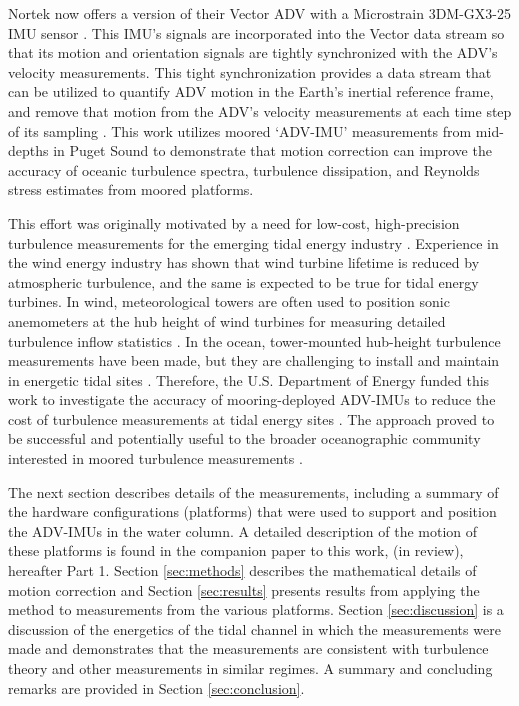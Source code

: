 Nortek now offers a version of their Vector ADV with a Microstrain 3DM-GX3-25 IMU sensor \cite[]{vector_manual2005, MicroStrain2012a}. This IMU's signals are incorporated into the Vector data stream so that its motion and orientation signals are tightly synchronized with the ADV's velocity measurements. This tight synchronization provides a data stream that can be utilized to quantify ADV motion in the Earth's inertial reference frame, and remove that motion from the ADV's velocity measurements at each time step of its sampling \cite[]{Edson++1998}. This work utilizes moored `ADV-IMU' measurements from mid-depths in Puget Sound to demonstrate that motion correction can improve the accuracy of oceanic turbulence spectra, turbulence dissipation, and Reynolds stress estimates from moored platforms.

This effort was originally motivated by a need for low-cost, high-precision turbulence measurements for the emerging tidal energy industry \cite[]{Mccaffrey++2015, Alexander+Hamlington2015}. Experience in the wind energy industry has shown that wind turbine lifetime is reduced by atmospheric turbulence, and the same is expected to be true for tidal energy turbines. In wind, meteorological towers are often used to position sonic anemometers at the hub height of wind turbines for measuring detailed turbulence inflow statistics \cite[]{Hand++2003, Kelley++2005, Mucke++2011, Afgan++2013}. In the ocean, tower-mounted hub-height turbulence measurements have been made, but they are challenging to install and maintain in energetic tidal sites \cite[]{Gunawan++2014,Thomson++2012}. Therefore, the U.S. Department of Energy funded this work to investigate the accuracy of mooring-deployed ADV-IMUs to reduce the cost of turbulence measurements at tidal energy sites \cite[]{Kilcher++2016}. The approach proved to be successful and potentially useful to the broader oceanographic community interested in moored turbulence measurements \cite[]{Lueck+Huang1999, Doherty++1999, Nash++2004, Moum+Nash2009b, Alford2010, Paskyabi+Fer2013}.

The next section describes details of the measurements, including a summary of the hardware configurations (platforms) that were used to support and position the ADV-IMUs in the water column. A detailed description of the motion of these platforms is found in the companion paper to this work, \citeauthor{Harding++2017} (in review), hereafter Part 1. Section \ref{sec:methods} describes the mathematical details of motion correction and Section \ref{sec:results} presents results from applying the method to measurements from the various platforms. Section \ref{sec:discussion} is a discussion of the energetics of the tidal channel in which the measurements were made and demonstrates that the measurements are consistent with turbulence theory and other measurements in similar regimes. A summary and concluding remarks are provided in Section \ref{sec:conclusion}.


